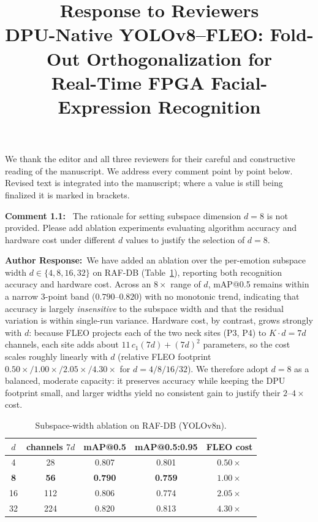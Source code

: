 \documentclass[11pt]{article}
\title{\vspace{-1.5cm}\bfseries Response to Reviewers\\[2pt]
\large DPU-Native YOLOv8--FLEO: Fold-Out Orthogonalization for\\ Real-Time FPGA Facial-Expression Recognition}
\author{}
\date{}
\newcommand{\comment}[1]{\smallskip\noindent\textbf{\color{navy}Comment #1:}\ }
\newcommand{\response}{\smallskip\par\noindent\textbf{\color{steel}Author Response:}\ }
\newcommand{\rev}[1]{\medskip\par\noindent{\large\bfseries\color{navy}#1}\par\smallskip}
\begin{document}
\maketitle
\vspace{-1.2cm}

\noindent We thank the editor and all three reviewers for their careful and constructive
reading of the manuscript. We address every comment point by point below. Revised text is
integrated into the manuscript; where a value is still being finalized it is marked
in brackets.

\rev{Reviewer 1}

\comment{1.1} The rationale for setting subspace dimension $d=8$ is not provided. Please add
ablation experiments evaluating algorithm accuracy and hardware cost under different $d$
values to justify the selection of $d=8$.

\response We have added an ablation over the per-emotion subspace width
$d\in\{4,8,16,32\}$ on RAF-DB (Table~\ref{tab:d}), reporting both recognition accuracy and
hardware cost. Across an $8\times$ range of $d$, mAP@0.5 remains within a narrow $3$-point
band ($0.790$--$0.820$) with no monotonic trend, indicating that accuracy is largely
\emph{insensitive} to the subspace width and that the residual variation is within
single-run variance. Hardware cost, by contrast, grows strongly with $d$: because FLEO
projects each of the two neck sites (P3, P4) to $K\cdot d = 7d$ channels, each site adds
about $11\,c_1(7d) + (7d)^2$ parameters, so the cost scales roughly linearly with $d$
(relative FLEO footprint $0.50\times/1.00\times/2.05\times/4.30\times$ for
$d=4/8/16/32$). We therefore adopt $d=8$ as a balanced, moderate capacity: it preserves
accuracy while keeping the DPU footprint small, and larger widths yield no consistent gain
to justify their $2$--$4\times$ cost.

\begin{table}[h]\centering\small
\caption{Subspace-width ablation on RAF-DB (YOLOv8n).}\label{tab:d}
\begin{tabular}{ccccc}
\toprule
$d$ & channels $7d$ & mAP@0.5 & mAP@0.5:0.95 & FLEO cost \\
\midrule
4  & 28  & 0.807 & 0.801 & $0.50\times$ \\
\textbf{8}  & \textbf{56}  & \textbf{0.790} & \textbf{0.759} & $\mathbf{1.00\times}$ \\
16 & 112 & 0.806 & 0.774 & $2.05\times$ \\
32 & 224 & 0.820 & 0.813 & $4.30\times$ \\
\bottomrule
\end{tabular}
\end{table}
\end{document}
